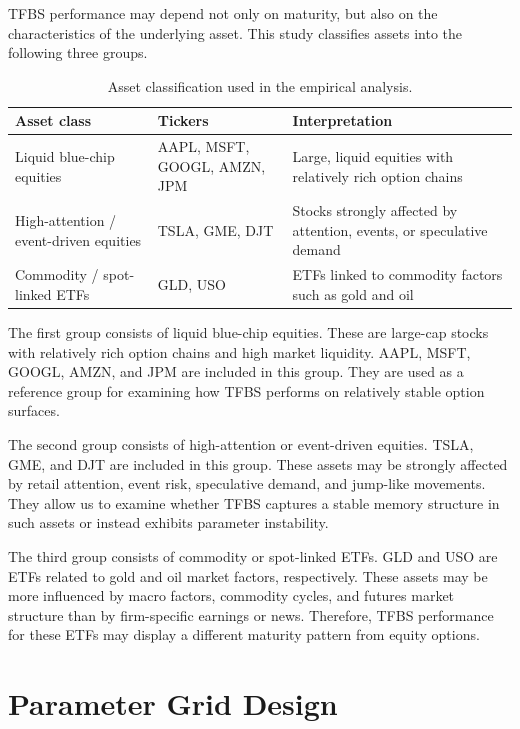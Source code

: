 \documentclass[11pt,a4paper]{report}
\begin{document}
TFBS performance may depend not only on maturity, but also on the characteristics of the underlying asset. This study classifies assets into the following three groups.

\begin{table}[htbp]
\centering
\small
\begin{tabularx}{\textwidth}{
@{}
>{\raggedright\arraybackslash}p{}
>{\raggedright\arraybackslash}p{}
>{\raggedright\arraybackslash}X
@{}
}
\toprule
Asset class & Tickers & Interpretation \\
\midrule
Liquid blue-chip equities
& AAPL, MSFT, GOOGL, AMZN, JPM
& Large, liquid equities with relatively rich option chains \\
\midrule
High-attention / event-driven equities
& TSLA, GME, DJT
& Stocks strongly affected by attention, events, or speculative demand \\
\midrule
Commodity / spot-linked ETFs
& GLD, USO
& ETFs linked to commodity factors such as gold and oil \\
\bottomrule
\end{tabularx}
\caption{Asset classification used in the empirical analysis.}
\label{tab:asset_classification}
\end{table}

The first group consists of liquid blue-chip equities. These are large-cap stocks with relatively rich option chains and high market liquidity. AAPL, MSFT, GOOGL, AMZN, and JPM are included in this group. They are used as a reference group for examining how TFBS performs on relatively stable option surfaces.

The second group consists of high-attention or event-driven equities. TSLA, GME, and DJT are included in this group. These assets may be strongly affected by retail attention, event risk, speculative demand, and jump-like movements. They allow us to examine whether TFBS captures a stable memory structure in such assets or instead exhibits parameter instability.

The third group consists of commodity or spot-linked ETFs. GLD and USO are ETFs related to gold and oil market factors, respectively. These assets may be more influenced by macro factors, commodity cycles, and futures market structure than by firm-specific earnings or news. Therefore, TFBS performance for these ETFs may display a different maturity pattern from equity options.

\section{Parameter Grid Design}
\end{document}
